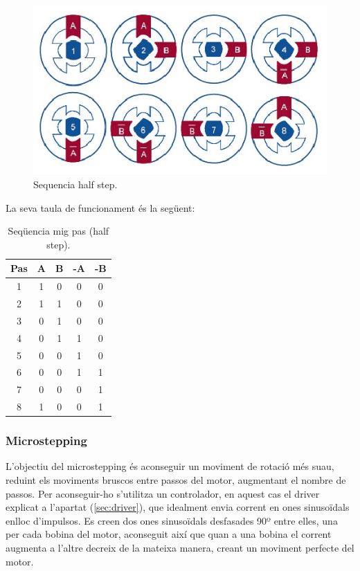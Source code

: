 \begin{figure}[H]
	\centering
	\includegraphics[scale=1.2]{Sequencia_halfstep.eps}
	\caption{Sequencia half step.}
	\label{fig:Sequencia half step}
\end{figure}
La seva taula de funcionament és la següent: 
\begin{table}[htbp]
	\begin{center}
		\begin{tabular}{|c||c|c|c|c|}
			\hline
			Pas & A & B & -A & -B \\
			\hline \hline
			1 & 1 & 0 & 0 & 0 \\ \hline
			2 & 1 & 1 & 0 & 0 \\ \hline
			3 & 0 & 1 & 0 & 0 \\ \hline
			4 & 0 & 1 & 1 & 0 \\ \hline
			5 & 0 & 0 & 1 & 0 \\ \hline
			6 & 0 & 0 & 1 & 1 \\ \hline
			7 & 0 & 0 & 0 & 1 \\ \hline
			8 & 1 & 0 & 0 & 1 \\ \hline	
		\end{tabular}
		\caption{Seqüencia mig pas (half step).}
		\label{tabla:hal step}
	\end{center}
\end{table}

\subsubsection{Microstepping}

L'objectiu del microstepping és aconseguir un moviment de rotació més suau, reduint els moviments bruscos entre passos del motor, augmentant el nombre de passos. Per aconseguir-ho s'utilitza un controlador, en aquest cas el driver explicat a l'apartat (\ref{sec:driver}), que idealment envia corrent en ones sinusoïdals enlloc d'impulsos. Es creen dos ones sinusoïdals desfasades 90º entre elles, una per cada bobina del motor, aconseguit així que quan a una bobina el corrent augmenta a l’altre decreix de la mateixa manera, creant un moviment perfecte del motor. 

